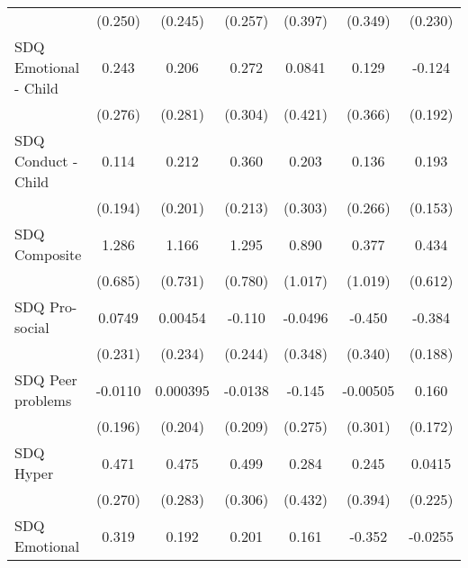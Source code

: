 {\begin{tabular}{l*{6}{c}}
            &     (0.250)         &     (0.245)         &     (0.257)         &     (0.397)         &     (0.349)         &     (0.230)         \\
\addlinespace
SDQ Emotional - Child&       0.243         &       0.206         &       0.272         &      0.0841         &       0.129         &      -0.124         \\
            &     (0.276)         &     (0.281)         &     (0.304)         &     (0.421)         &     (0.366)         &     (0.192)         \\
\addlinespace
SDQ Conduct - Child&       0.114         &       0.212         &       0.360         &       0.203         &       0.136         &       0.193         \\
            &     (0.194)         &     (0.201)         &     (0.213)         &     (0.303)         &     (0.266)         &     (0.153)         \\
\addlinespace
SDQ Composite&       1.286         &       1.166         &       1.295         &       0.890         &       0.377         &       0.434         \\
            &     (0.685)         &     (0.731)         &     (0.780)         &     (1.017)         &     (1.019)         &     (0.612)         \\
\addlinespace
SDQ Pro-social&      0.0749         &     0.00454         &      -0.110         &     -0.0496         &      -0.450         &      -0.384\sym{*}  \\
            &     (0.231)         &     (0.234)         &     (0.244)         &     (0.348)         &     (0.340)         &     (0.188)         \\
\addlinespace
SDQ Peer problems&     -0.0110         &    0.000395         &     -0.0138         &      -0.145         &    -0.00505         &       0.160         \\
            &     (0.196)         &     (0.204)         &     (0.209)         &     (0.275)         &     (0.301)         &     (0.172)         \\
\addlinespace
SDQ Hyper   &       0.471         &       0.475         &       0.499         &       0.284         &       0.245         &      0.0415         \\
            &     (0.270)         &     (0.283)         &     (0.306)         &     (0.432)         &     (0.394)         &     (0.225)         \\
\addlinespace
SDQ Emotional&       0.319         &       0.192         &       0.201         &       0.161         &      -0.352         &     -0.0255         \\

\end{tabular}}
